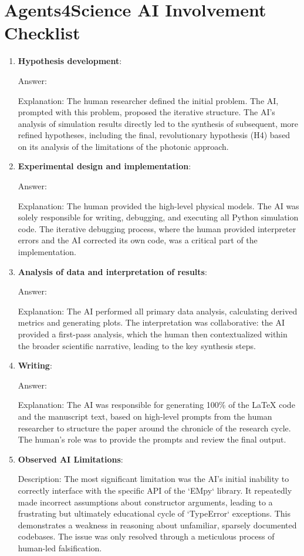 \documentclass{article}
\begin{document}
\appendix
\newpage
\section*{Agents4Science AI Involvement Checklist}

\begin{enumerate}
    \item \textbf{Hypothesis development}:

    Answer: \involvementC{}

    Explanation: The human researcher defined the initial problem. The AI, prompted with this problem, proposed the iterative structure. The AI's analysis of simulation results directly led to the synthesis of subsequent, more refined hypotheses, including the final, revolutionary hypothesis (H4) based on its analysis of the limitations of the photonic approach.
    \item \textbf{Experimental design and implementation}:

    Answer: \involvementC{}

    Explanation: The human provided the high-level physical models. The AI was solely responsible for writing, debugging, and executing all Python simulation code. The iterative debugging process, where the human provided interpreter errors and the AI corrected its own code, was a critical part of the implementation.
    \item \textbf{Analysis of data and interpretation of results}:

    Answer: \involvementC{}

    Explanation: The AI performed all primary data analysis, calculating derived metrics and generating plots. The interpretation was collaborative: the AI provided a first-pass analysis, which the human then contextualized within the broader scientific narrative, leading to the key synthesis steps.
    \item \textbf{Writing}:

    Answer: \involvementD{}

    Explanation: The AI was responsible for generating 100\% of the LaTeX code and the manuscript text, based on high-level prompts from the human researcher to structure the paper around the chronicle of the research cycle. The human's role was to provide the prompts and review the final output.

    \item \textbf{Observed AI Limitations}:

    Description: The most significant limitation was the AI's initial inability to correctly interface with the specific API of the `EMpy` library. It repeatedly made incorrect assumptions about constructor arguments, leading to a frustrating but ultimately educational cycle of `TypeError` exceptions. This demonstrates a weakness in reasoning about unfamiliar, sparsely documented codebases. The issue was only resolved through a meticulous process of human-led falsification.
\end{enumerate}
\end{document}
